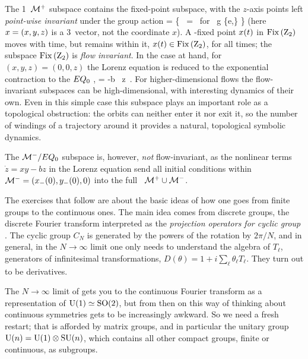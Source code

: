 The 1\dmn\ $\mathcal{M}^+$ subspace contains the fixed-point subspace, with the
$z$-axis points left \emph{point-wise invariant} under the group action
\beq
\Fix{\Ztwo} =
   \{ \ssp \in \pS \mid \LieEl  \, \ssp = \ssp \mbox{ for } g \in \{e,\} \}
(here $x = (x,y,z)$ is a 3\dmn\ vector, not the coordinate $x$). A
\Ztwo-fixed point $x(t)$ in $\mathrm{Fix}\left(\textrm{Z}_2\right)$ moves with time, but
remains within it, $x(t) \in \mathrm{Fix}\left(\textrm{Z}_2\right)$, for
all times; the  subspace $\mathrm{Fix}\left(\textrm{Z}_2\right)$ is {\em flow invariant}.
In the case at hand, for $(x,y,z)=(0,0,z)$ the Lorenz equation
 is reduced to the exponential contraction to the
$EQ_{0}$ \eqv,
\beq
{} = -b \, z
\,.
For higher-dim\-ens\-ion\-al flows the flow-invariant subspaces
can be high-dim\-ens\-ion\-al, with interesting dynamics of their own.
Even in this simple case this subspace plays an important role as a
topological obstruction: the orbits can neither enter it nor exit it, so
the number of windings of a trajectory around it provides a natural,
topological symbolic dynamics.

The $\mathcal{M}^-/EQ_{0}$ subspace is, however, {\em not} flow-invariant, as the
nonlinear terms $\dot{z}=xy - bz$ in the Lorenz equation 
send all initial conditions within $\mathcal{M}^-=(x_-(0),y_-(0),0)$ into the full
\statesp\  $\mathcal{M}^+\cup\mathcal{M}^-$.

\bigskip

The exercises that follow are about the basic
ideas of how one goes from finite groups to the continuous ones.
The main idea comes from discrete groups, the discrete Fourier transform
interpreted as the
{\em projection operators for cyclic group }. The cyclic group
$C_N$ is generated by the powers of the rotation by $2\pi/N$, and in
general, in the $N\to\infty$ limit one only needs to understand the
algebra of $T_\ell$, generators of infinitesimal transformations,
$D(\theta) = 1+i \sum_\ell \theta_\ell T_\ell$. They turn out to be
derivatives.

The $N\to\infty$ limit of  gets you to the continuous Fourier
transform as a representation of $\textrm{U}(1)\simeq\textrm{SO}(2)$, but from then on
this way of thinking about continuous symmetries gets to be increasingly
awkward. So we need a fresh restart; that is afforded by matrix groups,
and in particular the unitary group $\textrm{U}(n)=\textrm{U}(1)\otimes\textrm{SU}(n)$, which
contains all other compact groups, finite or continuous, as subgroups.

